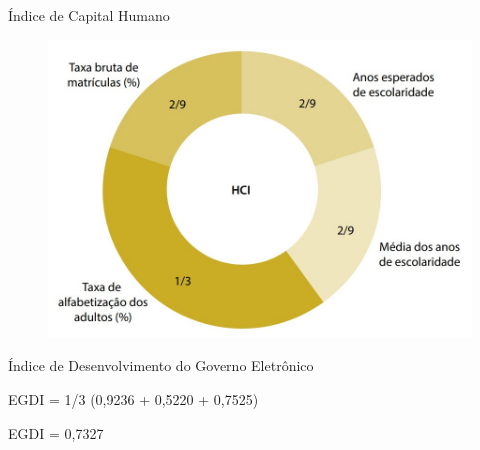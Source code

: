 \documentclass{Alexandre}
\begin{document}
\begin{frame}{Índice de Capital Humano}

    \begin{figure}
        \includegraphics[scale = 0.30]{Figuras/HCI.jpg}
    \end{figure}

\end{frame}


\begin{frame}{Índice de Desenvolvimento do Governo Eletrônico}

    EGDI =  1/3 (0,9236 + 0,5220 + 0,7525)
    
    \vspace{1cm}
    
    EGDI = 0,7327

\end{frame}
\end{document}
